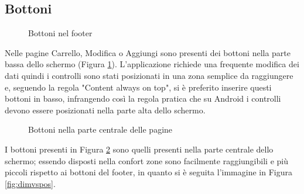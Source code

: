 \documentclass[12pt, a4paper, titlepage]{report}
\begin{document}
	\subsection{Bottoni}
	\begin{figure}[H] 
		\centering
		\hspace*{2cm}
		\caption{Bottoni nel footer}
		\label{fig:buttons}
	\end{figure}
	Nelle pagine Carrello, Modifica o Aggiungi sono presenti dei bottoni nella parte bassa dello schermo (Figura \ref{fig:buttons}). L'applicazione richiede una frequente modifica dei dati quindi i controlli sono stati posizionati in una zona semplice da raggiungere e, seguendo la regola "Content always on top", si è preferito inserire questi bottoni in basso, infrangendo così la regola pratica che su Android i controlli devono essere posizionati nella parte alta dello schermo. 
	\begin{figure}[H] 
		\centering
		\hspace*{1cm}
		\hspace*{1cm}
		\caption{Bottoni nella parte centrale delle pagine}
		\label{fig:item-buttons}
	\end{figure}
	\noindent I bottoni presenti in Figura \ref{fig:item-buttons} sono quelli presenti nella parte centrale dello schermo; essendo disposti nella confort zone sono facilmente raggiungibili e più piccoli rispetto ai bottoni del footer, in quanto si è seguita l'immagine in Figura \ref{fig:dimvspos}.
\end{document}
